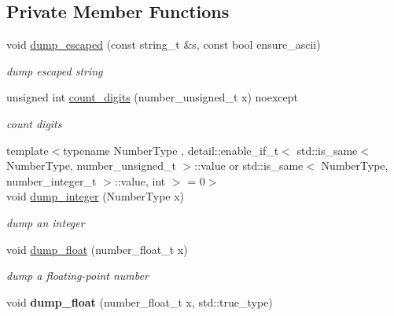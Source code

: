 \subsection*{Private Member Functions}
\begin{DoxyCompactItemize}
\item 
void \mbox{\hyperlink{classnlohmann_1_1detail_1_1serializer_ac1f8d1165b44149bd8be397dce68ea05}{dump\+\_\+escaped}} (const string\+\_\+t \&s, const bool ensure\+\_\+ascii)
\begin{DoxyCompactList}\small\item\em dump escaped string \end{DoxyCompactList}\item 
unsigned int \mbox{\hyperlink{classnlohmann_1_1detail_1_1serializer_a10692e98ea1f5a64de1d0b8e0e724b99}{count\+\_\+digits}} (number\+\_\+unsigned\+\_\+t x) noexcept
\begin{DoxyCompactList}\small\item\em count digits \end{DoxyCompactList}\item 
{\footnotesize template$<$typename Number\+Type , detail\+::enable\+\_\+if\+\_\+t$<$ std\+::is\+\_\+same$<$ Number\+Type, number\+\_\+unsigned\+\_\+t $>$\+::value or std\+::is\+\_\+same$<$ Number\+Type, number\+\_\+integer\+\_\+t $>$\+::value, int $>$  = 0$>$ }\\void \mbox{\hyperlink{classnlohmann_1_1detail_1_1serializer_a944f6dea8dbe2961da145d2f62fa2c2f}{dump\+\_\+integer}} (Number\+Type x)
\begin{DoxyCompactList}\small\item\em dump an integer \end{DoxyCompactList}\item 
void \mbox{\hyperlink{classnlohmann_1_1detail_1_1serializer_a6d652a3bfa581cf1cd7790d6d11ea52f}{dump\+\_\+float}} (number\+\_\+float\+\_\+t x)
\begin{DoxyCompactList}\small\item\em dump a floating-\/point number \end{DoxyCompactList}\item 
\mbox{\label{classnlohmann_1_1detail_1_1serializer_a24b0fe45dc774441237bde198a133d8a}} 
void {\bfseries dump\+\_\+float} (number\+\_\+float\+\_\+t x, std\+::true\+\_\+type)
\item 
\mbox{\label{classnlohmann_1_1detail_1_1serializer_a331dad892fc00313f928fdaa6bc8f849}} 

\end{DoxyCompactItemize}
